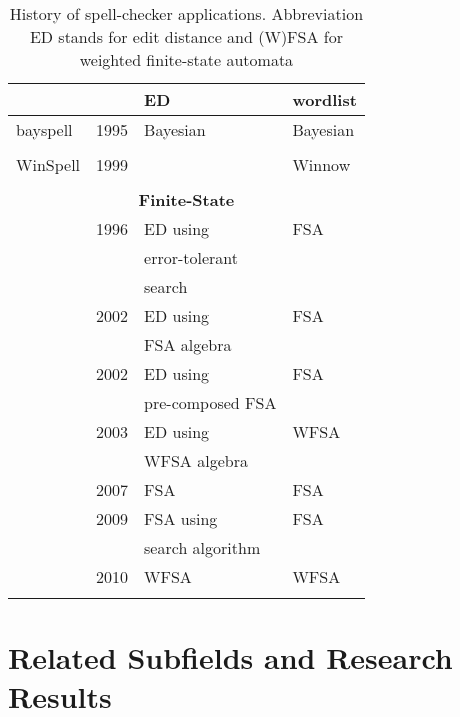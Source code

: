 \documentclass[officiallayout,final]{unihelcompling}
\begin{document}
\begin{longtable}[ht]{|l|r|l|l|}
        \citep{church1991probability} & & ED & wordlist \\
        \hline
        bayspell  & 1995 & Bayesian & Bayesian \\
        \citep{golding1995bayesian} & & & \\
        \hline
        WinSpell & 1999 & & Winnow \\
        \citep{golding1999winnow} & & & \\
        \hline
        \multicolumn{4}{|c|}{\bf Finite-State} \\
        \hline
      \citep{oflazer1996errortolerant} & 1996 & ED using & FSA \\
                                       &      & error-tolerant & \\
                                       &      & search & \\
\citep{agata2002typographical} & 2002 & ED using & FSA \\
                               &      & FSA algebra &  \\
      \citep{schulz2002fast} & 2002 & ED using         & FSA  \\
                             &      & pre-composed FSA & \\
        \citep{mohri2003edit} & 2003 & ED using & WFSA \\
                              &      & WFSA algebra &  \\
    \citep{otero2007contextual} & 2007 & FSA & FSA  \\
      \citep{hulden2009fast} & 2009 & FSA using & FSA \\
                                &   & search algorithm & \\
\citep{pirinen2010finitestate} & 2010 & WFSA & WFSA \\
        \hline
    \caption{History of spell-checker applications. Abbreviation ED stands for
    edit distance and (W)FSA for weighted finite-state automata
    \label{table:history-apps}}
\end{longtable}

\section{Related Subfields and Research Results}
\label{sec:related}
\end{document}
